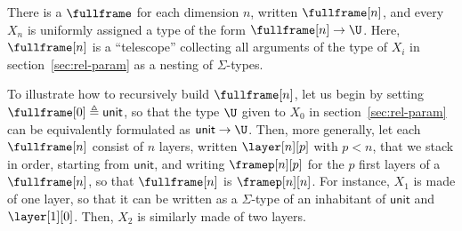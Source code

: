 \documentclass{msc}
\newcommand{\unittype}{\ensuremath{\mathsf{unit}}}
\newcommand{\defeq}{\ensuremath{\triangleq}}
\begin{document}
There is a $\fullframe$ for each dimension $n$, written $\fullframe[n]$, and every $X_n$ is uniformly assigned a type of the form $\fullframe[n] \rightarrow \U$. Here, $\fullframe[n]$ is a ``telescope'' collecting all arguments of the type of $X_i$ in section~\ref{sec:rel-param} as a nesting of $\Sigma$-types.

To illustrate how to recursively build $\fullframe[n]$, let us begin by setting $\fullframe[0] \defeq \unittype$, so that the type $\U$ given to $X_0$ in section~\ref{sec:rel-param} can be equivalently formulated as $\unittype \rightarrow \U$. Then, more generally, let each $\fullframe[n]$ consist of $n$ layers, written $\layer[n][p]$ with $p < n$, that we stack in order, starting from $\unittype$, and writing $\framep[n][p]$ for the $p$ first layers of a $\fullframe[n]$, so that $\fullframe[n]$ is $\framep[n][n]$. For instance, $X_1$ is made of one layer, so that it can be written as a $\Sigma$-type of an inhabitant of $\unittype$ and $\layer[1][0]$. Then, $X_2$ is similarly made of two layers.
\end{document}
